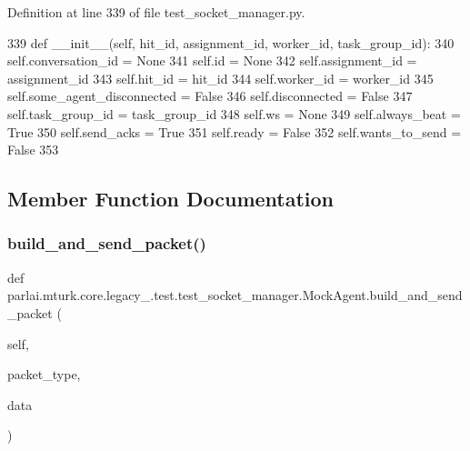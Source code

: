 Definition at line 339 of file test\+\_\+socket\+\_\+manager.\+py.


\begin{DoxyCode}
339     \textcolor{keyword}{def }\_\_init\_\_(self, hit\_id, assignment\_id, worker\_id, task\_group\_id):
340         self.conversation\_id = \textcolor{keywordtype}{None}
341         self.id = \textcolor{keywordtype}{None}
342         self.assignment\_id = assignment\_id
343         self.hit\_id = hit\_id
344         self.worker\_id = worker\_id
345         self.some\_agent\_disconnected = \textcolor{keyword}{False}
346         self.disconnected = \textcolor{keyword}{False}
347         self.task\_group\_id = task\_group\_id
348         self.ws = \textcolor{keywordtype}{None}
349         self.always\_beat = \textcolor{keyword}{True}
350         self.send\_acks = \textcolor{keyword}{True}
351         self.ready = \textcolor{keyword}{False}
352         self.wants\_to\_send = \textcolor{keyword}{False}
353 
\end{DoxyCode}


\subsection{Member Function Documentation}
\mbox{\label{classparlai_1_1mturk_1_1core_1_1legacy__2018_1_1test_1_1test__socket__manager_1_1MockAgent_a92049431d43dcfefe8bea697f7c81aa4}} 
\subsubsection{\texorpdfstring{build\+\_\+and\+\_\+send\+\_\+packet()}{build\_and\_send\_packet()}}
{\footnotesize\ttfamily def parlai.\+mturk.\+core.\+legacy\+\_.\+test.\+test\+\_\+socket\+\_\+manager.\+Mock\+Agent.\+build\+\_\+and\+\_\+send\+\_\+packet (\begin{DoxyParamCaption}\item[{}]{self,  }\item[{}]{packet\+\_\+type,  }\item[{}]{data }\end{DoxyParamCaption})}



